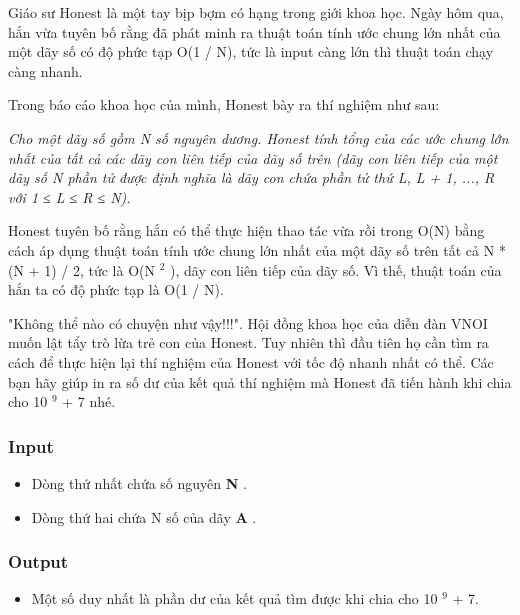 



   Giáo sư Honest là một tay bịp bợm có hạng trong giới khoa học. Ngày hôm qua, hắn vừa tuyên bố rằng đã phát minh ra thuật toán tính ước chung lớn nhất của một dãy số có độ phức tạp O(1 / N), tức là input càng lớn thì thuật toán chạy càng nhanh.  

   Trong báo cáo khoa học của mình, Honest bày ra thí nghiệm như sau:  

\emph{    Cho một dãy số gồm N số nguyên dương. Honest tính tổng của các ước chung lớn nhất của tất cả các dãy con liên tiếp của dãy số trên (dãy con liên tiếp của một dãy số N phần tử được định nghĩa là dãy con chứa phần tử thứ L, L + 1, ..., R với 1 ≤ L ≤ R ≤ N).   }

   Honest tuyên bố rằng hắn có thể thực hiện thao tác vừa rồi trong O(N) bằng cách áp dụng thuật toán tính ước chung lớn nhất của một dãy số trên tất cả N * (N + 1) / 2, tức là O(N   $^    2   $   ), dãy con liên tiếp của dãy số. Vì thế, thuật toán của hắn ta có độ phức tạp là O(1 / N).  

   "Không thể nào có chuyện như vậy!!!". Hội đồng khoa học của diễn đàn VNOI muốn lật tẩy trò lừa trẻ con của Honest. Tuy nhiên thì đầu tiên họ cần tìm ra cách để thực hiện lại thí nghiệm của Honest với tốc độ nhanh nhất có thể. Các bạn hãy giúp in ra số dư của kết quả thí nghiệm mà Honest đã tiến hành khi chia cho 10   $^    9   $   + 7 nhé.  

\subsubsection{   Input  }
\begin{itemize}
	\item     Dòng thứ nhất chứa số nguyên    \textbf{     N    }    .   
	\item     Dòng thứ hai chứa N số của dãy    \textbf{     A    }    .   
\end{itemize}

\subsubsection{   Output  }
\begin{itemize}
	\item     Một số duy nhất là phần dư của kết quả tìm được khi chia cho 10    $^     9    $    + 7.   
\end{itemize}

